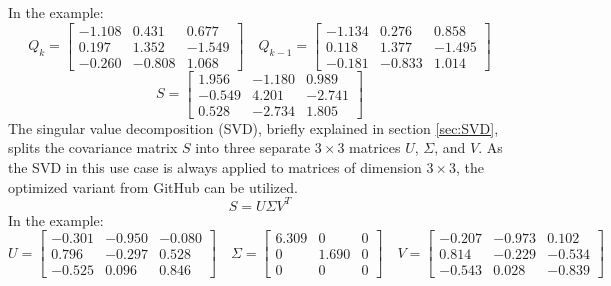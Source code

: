 In the example:
\begin{equation*}
    Q_{k}=
    \begin{bmatrix}
        -1.108 & 0.431  & 0.677  \\
        0.197  & 1.352  & -1.549 \\
        -0.260 & -0.808 & 1.068
    \end{bmatrix} \quad
    Q_{k-1}=
    \begin{bmatrix}
        -1.134 & 0.276  & 0.858  \\
        0.118  & 1.377  & -1.495 \\
        -0.181 & -0.833 & 1.014
    \end{bmatrix}
\end{equation*}
\begin{equation*}
    S= 
    \begin{bmatrix}
        1.956 & -1.180 & 0.989 \\
        -0.549 & 4.201 & -2.741 \\
        0.528 & -2.734 & 1.805
    \end{bmatrix}
\end{equation*}
The singular value decomposition (SVD), briefly explained in section \ref{sec:SVD}, splits the covariance matrix $S$ into three separate $3\times3$ matrices $U$, $\Sigma$, and $V$. As the SVD in this use case is always applied to matrices of dimension $3\times3$, the optimized variant\cite{Gao:2018:GPU_MPM} from GitHub\cite{Github_SVD_CUDA} can be utilized.
\begin{equation*}
    S= U\Sigma V^{T}
\end{equation*}
In the example:
\begin{equation*}
    U=
    \begin{bmatrix}
        -0.301 & -0.950 & -0.080 \\
        0.796 & -0.297 & 0.528 \\
        -0.525 & 0.096 & 0.846
    \end{bmatrix} \quad
    \Sigma=
    \begin{bmatrix}
        6.309 & 0 & 0 \\
        0 & 1.690 & 0 \\
        0 & 0 & 0
    \end{bmatrix} \quad
    V=
    \begin{bmatrix}
        -0.207 & -0.973 & 0.102 \\
        0.814 & -0.229 & -0.534 \\
        -0.543 & 0.028 & -0.839
    \end{bmatrix}
\end{equation*}
